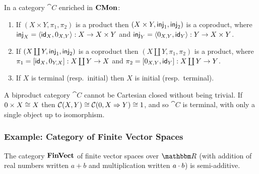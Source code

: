 \begin{proposition}
\label{prop:biproducts:from-product-or-coproduct}
In a category $\cat{C}$ enriched in $\mathbf{CMon}$:
\begin{enumerate}
\item If $(X \times Y, \pi_1, \pi_2)$ is a product then $(X \times Y, \mathsf{inj}_1, \mathsf{inj}_2)$ is a coproduct, where
$\mathsf{inj}_X = \langle \mathsf{id}_X, 0_{X,Y}\rangle: X \to X \times Y$ and $\mathsf{inj}_Y = \langle 0_{X,Y}, \mathsf{id}_Y\rangle: Y \to X \times Y$.
\item If $(X \coprod Y, \mathsf{inj}_1, \mathsf{inj}_2)$ is a coproduct then $(X \coprod Y, \pi_1, \pi_2)$ is a product, where
$\pi_1 = [\mathsf{id}_X, 0_{Y,X}]: X \coprod Y \to X$ and $\pi_2 = [0_{X,Y}, \mathsf{id}_Y]: X \coprod Y \to
Y$.
\item If $X$ is terminal (resp.~initial) then $X$ is initial (resp.~terminal).
\end{enumerate}
\end{proposition}

A biproduct category $\cat{C}$ cannot be Cartesian closed without being trivial. If $0 \times X \cong X$ then
${\mathcal{C}}(X,Y) \cong {\mathcal{C}}(0,X \Rightarrow Y) \cong 1$, and so $\cat{C}$ is terminal, with only a
single object up to isomorphism.

\subsubsection{Example: Category of Finite Vector Spaces}
\label{sec:categories-with-biproducts:fdvect}

The category $\mathbf{FinVect}$ of finite vector spaces over $\RR$ (with addition of real numbers written $a + b$ and
multiplication written $a \cdot b$) is semi-additive.

